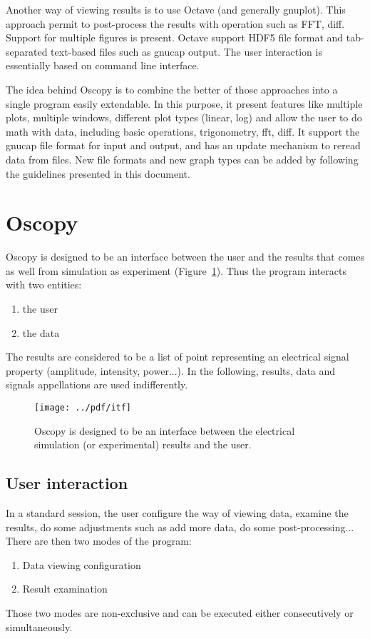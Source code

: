 \documentclass[a4paper,11pt]{article}
\begin{document}
Another way of viewing results is to use Octave (and generally gnuplot).
This approach permit to post-process the results with operation such as FFT, diff.
Support for multiple figures is present.
Octave support HDF5 file format and tab-separated text-based files such as gnucap output.
The user interaction is essentially based on command line interface.

The idea behind Oscopy is to combine the better of those approaches into a single program easily extendable.
In this purpose, it present features like multiple plots, multiple windows, different plot types (linear, log) and allow the user to do math with data, including basic operations, trigonometry, fft, diff.
It support the gnucap file format for input and output, and has an update mechanism to reread data from files.
New file formats and new graph types can be added by following the guidelines presented in this document.

\section{Oscopy}
\label{sec:itf}
Oscopy is designed to be an interface between the user and the results that comes as well from simulation as experiment (Figure~\ref{fig:itf}).
Thus the program interacts with two entities:
\begin{enumerate}
\item the user
\item the data
\end{enumerate}
The results are considered to be a list of point representing an electrical signal property (amplitude, intensity, power...).
In the following, results, data and signals appellations are used indifferently.

\begin{figure}[htbp]
  \centering
  \texttt{[image: ../pdf/itf]}
  \caption{Oscopy is designed to be an interface between the electrical simulation (or experimental) results and the user.}
  \label{fig:itf}
\end{figure}

\subsection{User interaction}
\label{sec:user}
In a standard session, the user configure the way of viewing data, examine the results, do some adjustments such as add more data, do some post-processing...
There are then two modes of the program:
\begin{enumerate}
\item Data viewing configuration
\item Result examination
\end{enumerate}
Those two modes are non-exclusive and can be executed either consecutively or simultaneously.
\end{document}

